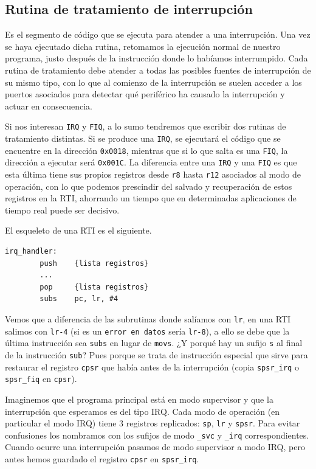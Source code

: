 \subsection{Rutina de tratamiento de interrupción}

Es el segmento de código que se ejecuta para atender a una interrupción. Una vez se haya
ejecutado dicha rutina, retomamos la ejecución normal de nuestro programa, justo después de la instrucción
donde lo habíamos interrumpido. Cada rutina de tratamiento debe atender a todas las posibles
fuentes de interrupción de su mismo tipo, con lo que al comienzo de la interrupción se suelen
acceder a los puertos asociados para detectar qué periférico ha causado la interrupción y
actuar en consecuencia.

Si nos interesan {\tt IRQ} y {\tt FIQ}, a lo sumo tendremos que escribir dos
rutinas de tratamiento distintas. Si se produce una {\tt IRQ}, se ejecutará el código
que se encuentre en la dirección {\tt 0x0018}, mientras que si lo que salta es una {\tt FIQ},
la dirección a ejecutar será {\tt 0x001C}. La diferencia entre una {\tt IRQ} y una
{\tt FIQ} es que esta última tiene sus propios registros desde {\tt r8} hasta {\tt r12}
asociados al modo de operación, con lo que podemos prescindir del salvado y recuperación
de estos registros en la RTI, ahorrando un tiempo que en determinadas aplicaciones de
tiempo real puede ser decisivo.

El esqueleto de una RTI es el siguiente.

\begin{lstlisting}
irq_handler:
        push    {lista registros}
        ...
        pop     {lista registros}
        subs    pc, lr, #4
\end{lstlisting}

Vemos que a diferencia de las subrutinas donde salíamos con {\tt lr}, en una RTI salimos
con {\tt lr-4} (si es un {\tt error en datos} sería {\tt lr-8}), a ello se debe que la última
instrucción sea {\tt subs} en lugar de {\tt movs}.
¿Y porqué hay un sufijo {\tt s} al final
de la instrucción {\tt sub}? Pues porque se trata de instrucción especial que sirve para
restaurar el registro {\tt cpsr} que había antes de la interrupción (copia {\tt spsr\_irq} o
{\tt spsr\_fiq} en {\tt cpsr}).

Imaginemos que el programa principal está en modo supervisor y que la interrupción que
esperamos es del tipo IRQ.
Cada modo de operación (en particular el modo IRQ) tiene 3 registros replicados: {\tt sp}, {\tt lr} y {\tt spsr}.
Para evitar confusiones los nombramos con los sufijos de modo {\tt \_svc} y {\tt \_irq} correspondientes.
Cuando ocurre una interrupción pasamos de modo supervisor a modo IRQ, pero antes hemos guardado
el registro {\tt cpsr} en {\tt spsr\_irq}.

